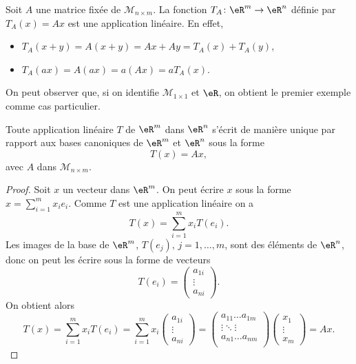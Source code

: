\begin{example}\label{exampleT_A}
	Soit $A$ une matrice fixée de $\mathcal{M}_{n\times m}$. La fonction $T_A\colon \eR^m\to \eR^n$ définie par $T_A(x)=Ax$ est une application linéaire. En effet, 
\begin{itemize}
\item  $T_A(x+y)= A(x+y)= Ax + Ay = T_A(x)+T_A(y)$,
\item $T_A(ax)=A(ax)= a(Ax) = a T_A(x)$.
\end{itemize}
\end{example}

On peut observer que, si on identifie $\mathcal{M}_{1\times 1}$ et $\eR$, on obtient le premier exemple comme cas particulier.

\begin{proposition}
 Toute application linéaire $T$ de $\eR^m$ dans $\eR^n$ s'écrit de manière unique par rapport aux bases canoniques de $\eR^m$ et $\eR^n$ sous la forme
\[
T(x)=Ax,
\]
avec $A$ dans $\mathcal{M}_{n\times m}$.
\end{proposition}

\begin{proof}
  Soit $x$ un vecteur dans $\eR^m$. On peut écrire $x$ sous la forme $ x=\sum_{i=1}^{m}x_i e_i$. Comme $T$ est une application linéaire on a
\[
T(x)=\sum_{i=1}^{m}x_iT(e_i).
\]
Les images de la base de $\eR^m$, $T(e_j), \, j=1,\ldots,m$, sont des éléments de $\eR^n$, donc on peut les écrire sous la forme de vecteurs
\[
T(e_i)=
\begin{pmatrix}
  a_{1i}\\
\vdots\\
a_{ni}
\end{pmatrix}.
\] 
On obtient alors
\[
T(x)=\sum_{i=1}^{m}x_iT(e_i)=\sum_{i=1}^{m}x_i\begin{pmatrix}
  a_{1i}\\
\vdots\\
a_{ni}
\end{pmatrix}=
\begin{pmatrix}
  a_{11} \ldots a_{1m}\\
\vdots \ddots \vdots\\
 a_{n1} \ldots a_{nm}\\
\end{pmatrix}
\begin{pmatrix}
  x_1\\
\vdots\\
x_m
\end{pmatrix}=Ax.
\]
\end{proof}


